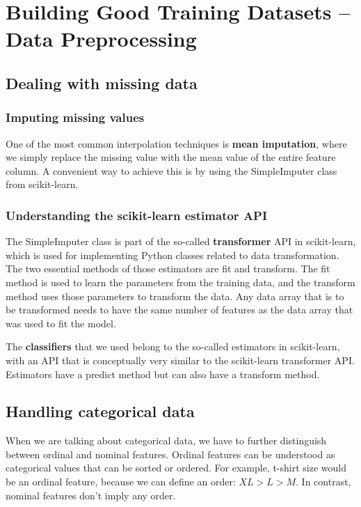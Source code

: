 \chapter{Building Good Training Datasets – Data Preprocessing}
\section{Dealing with missing data}
\subsection{Imputing missing values}
One of the most common interpolation techniques is \textbf{mean imputation}, where we simply replace the missing value with the mean value of the entire feature column. A convenient way to achieve this is by using the SimpleImputer class from scikit-learn.
\subsection{Understanding the scikit-learn estimator API}
The SimpleImputer class is part of the so-called \textbf{transformer} API in scikit-learn, which is used for implementing Python classes related to data transformation. The two essential methods of those estimators are fit and transform. The fit method is used to learn the parameters from the training data, and the transform method uses those parameters to transform the data. Any data array that is to be transformed needs to have the same number of features as the data array that was used to fit the model.


The \textbf{classifiers} that we used belong to the so-called estimators in scikit-learn, with an API that is conceptually very similar to the scikit-learn transformer API. Estimators have a predict method but can also have a transform method.

\section{Handling categorical data}
When we are talking about categorical data, we have to further distinguish between ordinal and nominal features. Ordinal features can be understood as categorical values that can be sorted or ordered. For example, t-shirt size would be an ordinal feature, because we can define an order: $XL > L > M$. In contrast, nominal features don’t imply any order.
